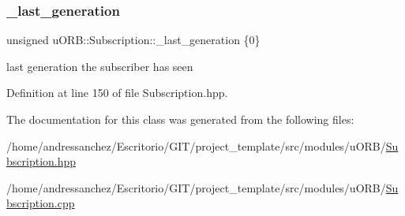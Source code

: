 \subsubsection{\texorpdfstring{\+\_\+last\+\_\+generation}{\_last\_generation}}
{\footnotesize\ttfamily unsigned u\+O\+R\+B\+::\+Subscription\+::\+\_\+last\+\_\+generation \{0\}\hspace{0.3cm}{\ttfamily [protected]}}

last generation the subscriber has seen 

Definition at line 150 of file Subscription.\+hpp.



The documentation for this class was generated from the following files\+:\begin{DoxyCompactItemize}
\item 
/home/andressanchez/\+Escritorio/\+G\+I\+T/project\+\_\+template/src/modules/u\+O\+R\+B/\hyperlink{Subscription_8hpp}{Subscription.\+hpp}\item 
/home/andressanchez/\+Escritorio/\+G\+I\+T/project\+\_\+template/src/modules/u\+O\+R\+B/\hyperlink{Subscription_8cpp}{Subscription.\+cpp}\end{DoxyCompactItemize}
